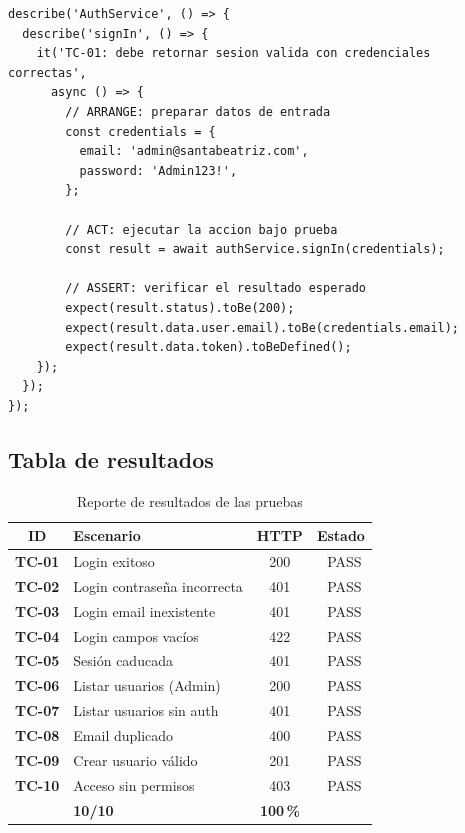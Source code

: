 \documentclass[12pt, letterpaper]{article}
\newcommand{\tcpassed}{\textcolor{successGreen}{\faCheckCircle\ PASS}}
\begin{document}
\begin{lstlisting}[caption={Prueba unitaria del AuthService --- sign-in exitoso}]
describe('AuthService', () => {
  describe('signIn', () => {
    it('TC-01: debe retornar sesion valida con credenciales correctas',
      async () => {
        // ARRANGE: preparar datos de entrada
        const credentials = {
          email: 'admin@santabeatriz.com',
          password: 'Admin123!',
        };

        // ACT: ejecutar la accion bajo prueba
        const result = await authService.signIn(credentials);

        // ASSERT: verificar el resultado esperado
        expect(result.status).toBe(200);
        expect(result.data.user.email).toBe(credentials.email);
        expect(result.data.token).toBeDefined();
    });
  });
});
\end{lstlisting}

\subsection{Tabla de resultados}

\begin{table}[h!]
\centering
\renewcommand{\arraystretch}{1.5}
\begin{tabular}{>{\bfseries}c l c c}
\toprule
\textcolor{lasalleBlue}{ID} &
\textcolor{lasalleBlue}{Escenario} &
\textcolor{lasalleBlue}{HTTP} &
\textcolor{lasalleBlue}{Estado} \\
\midrule
TC-01 & Login exitoso                    & 200 & \tcpassed \\
TC-02 & Login contraseña incorrecta      & 401 & \tcpassed \\
TC-03 & Login email inexistente          & 401 & \tcpassed \\
TC-04 & Login campos vacíos              & 422 & \tcpassed \\
TC-05 & Sesión caducada                  & 401 & \tcpassed \\
TC-06 & Listar usuarios (Admin)          & 200 & \tcpassed \\
TC-07 & Listar usuarios sin auth         & 401 & \tcpassed \\
TC-08 & Email duplicado                  & 400 & \tcpassed \\
TC-09 & Crear usuario válido             & 201 & \tcpassed \\
TC-10 & Acceso sin permisos              & 403 & \tcpassed \\
\midrule
\multicolumn{2}{r}{\textbf{Total}} & \textbf{10/10} &
  \textcolor{successGreen}{\bfseries 100\,\%} \\
\bottomrule
\end{tabular}
\caption{Reporte de resultados de las pruebas}
\end{table}
\end{document}
